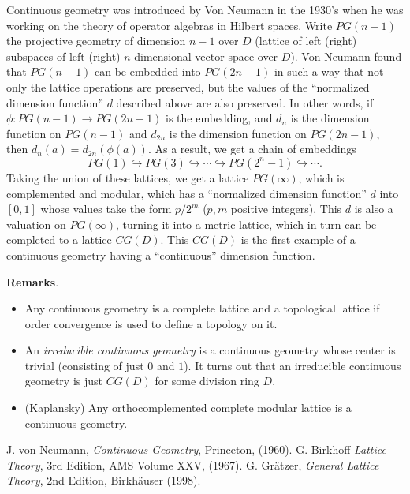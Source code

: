 \documentclass[12pt]{article}
\begin{document}
Continuous geometry was introduced by Von Neumann in the 1930's when he was working on the theory of operator algebras in Hilbert spaces.  Write $PG(n-1)$ the projective geometry of dimension $n-1$ over $D$ (lattice of left (right) subspaces of left (right) $n$-dimensional vector space over $D$).  Von Neumann found that $PG(n-1)$ can be embedded into $PG(2n-1)$ in such a way that not only the lattice operations are preserved, but the values of the ``normalized dimension function'' $d$ described above are also preserved.  In other words, if $\phi:PG(n-1)\to PG(2n-1)$ is the embedding, and $d_{n}$ is the dimension function on $PG(n-1)$ and $d_{2n}$ is the dimension function on $PG(2n-1)$, then  $d_{n}(a)=d_{2n}(\phi(a))$.  As a result, we get a chain of embeddings $$PG(1)\hookrightarrow PG(3)\hookrightarrow  \cdots \hookrightarrow  PG(2^n-1) \hookrightarrow  \cdots.$$
Taking the union of these lattices, we get a lattice $PG(\infty)$, which is complemented and modular, which has a ``normalized dimension function'' $d$ into $[0,1]$ whose values take the form $p/2^m$ ($p,m$ positive integers).  This $d$ is also a valuation on $PG(\infty)$, turning it into a metric lattice, which in turn can be completed to a lattice $CG(D)$.  This $CG(D)$ is the first example of a continuous geometry having a ``continuous'' dimension function.


\textbf{Remarks}.
\begin{itemize}
\item Any continuous geometry is a complete lattice and a topological lattice if order convergence is used to define a topology on it.
\item An \emph{irreducible continuous geometry} is a continuous geometry whose center is trivial (consisting of just $0$ and $1$).  It turns out that an irreducible continuous geometry is just $CG(D)$ for some division ring $D$. 
\item (Kaplansky) Any orthocomplemented complete modular lattice is a continuous geometry.
\end{itemize}

\begin{thebibliography}{8}
 J. von Neumann, {\em Continuous Geometry}, Princeton, (1960).
 G. Birkhoff {\em Lattice Theory}, 3rd Edition, AMS Volume XXV, (1967).
 G. Gr\"{a}tzer, {\em General Lattice Theory}, 2nd Edition, Birkh\"{a}user (1998).
\end{thebibliography}
\end{document}
